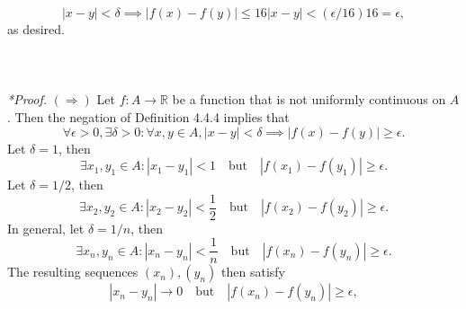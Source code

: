 \documentclass{article}
\begin{document}
            \begin{equation*}
                |x-y|<\delta \implies |f(x) - f(y)| \leq 16 |x-y| < (\epsilon/16)16 = \epsilon,
            \end{equation*}
            as desired.
            \\ \\
            \\ \\
            \textit{*Proof.} $(\Rightarrow)$ Let $f:A \to \mathbb{R}$ be a function that is not uniformly continuous on $A$. Then the negation of Definition 4.4.4 implies that
            \begin{equation*}
                \forall \epsilon > 0, \exists \delta > 0: \forall x,y \in A, |x-y|<\delta \implies |f(x)-f(y)| \geq \epsilon.
            \end{equation*}
            Let $\delta = 1$, then
            \begin{equation*}
                \exists x_1, y_1 \in A: |x_1-y_1|<1 \quad \text{but} \quad |f(x_1)-f(y_1)| \geq \epsilon.
            \end{equation*}
            Let $\delta = 1/2$, then
            \begin{equation*}
                \exists x_2,y_2 \in A: |x_2-y_2| < \frac{1}{2} \quad \text{but} \quad |f(x_2)-f(y_2)| \geq \epsilon.
            \end{equation*}
            In general, let $\delta = 1/n$, then
            \begin{equation*}
                \exists x_n,y_n \in A: |x_n-y_n| < \frac{1}{n} \quad \text{but} \quad |f(x_n)-f(y_n)| \geq \epsilon.
            \end{equation*}
            The resulting sequences $(x_n),(y_n)$ then satisfy
            \begin{equation*}
                |x_n-y_n| \to 0 \quad \text{but} \quad |f(x_n)-f(y_n)| \geq \epsilon,
            \end{equation*}
\end{document}
